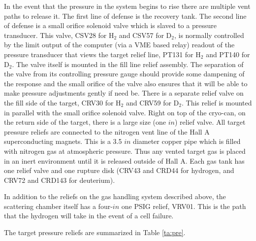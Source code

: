 {\begin{safetyen}{10}{5}
In the event that the pressure in the system begins to rise there are multiple
vent paths to release it. The first line of defense is the recovery tank.
The second line of defense is a small orifice solenoid valve
which is slaved to a pressure transducer. This valve, CSV28 for H$_2$ and
CSV57 for D$_2$, 
is normally controlled by the limit
output of the computer (via a VME based relay) readout of
the pressure transducer that views the target
relief line, PT131 for H$_2$ and PT140 for D$_2$. The valve itself is mounted
in the fill line relief assembly. The separation of the valve from its
controlling pressure gauge should provide some dampening of the response
and the small orifice of the valve also ensures that it will
be able to make pressure adjustments gently if need be.
There is 
a separate relief valve on the fill side of the target, CRV30 for H$_2$ and
CRV59 for D$_2$. This relief is mounted in parallel with the small orifice 
solenoid valve. Right on top of the cryo-can, on the return side of the target,
there is a large size (one $in$) relief valve.
All target pressure reliefs are connected to the
nitrogen vent line of the Hall A superconducting magnets.
This is a 3.5 $in$ diameter 
copper pipe which is filled with nitrogen gas at atmospheric pressure.
Thus any vented target gas is placed in an inert environment until it is
released outside of Hall A. Each gas tank has one relief valve and one rupture
disk (CRV43 and CRD44 for hydrogen, and CRV72 and CRD143 for deuterium).
 
In addition to the reliefs on the gas handling system described above, the
scattering chamber itself has a four-$in$ one PSIG relief, VRV01.
This is the path that the
hydrogen will take in the event of a cell failure.   

The target pressure reliefs are summarized in Table \ref{ta:pre}.


\end{safetyen}}

